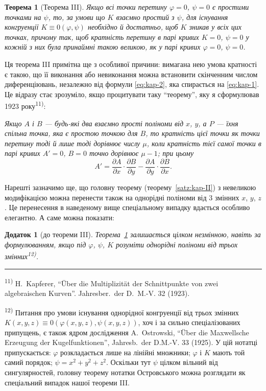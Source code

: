 \documentclass[11pt]{article}
\newcommand{\foreign}[1]{#1}
\theoremstyle{plain}
\newtheorem{satz}{Теорема}
\newtheorem{zusatz}{Додаток}
\begin{document}
\begin{satz}[Теорема III]\label{satz:kap-III}
Якщо всі точки перетину $\varphi = 0$, $\psi = 0$ є простими
точками на $\psi$, то, за умови що $K$ взаємно простий з $\psi$,
для існування конгруенції $K \equiv 0(\varphi, \psi)$ необхідно й
достатньо, щоб $K$ зникав у всіх цих точках, причому так, щоб
кратність перетину в парі кривих $K = 0$, $\psi = 0$ у кожній з них
була принаймні такою великою, як у парі кривих
$\varphi = 0$, $\psi = 0$.
\end{satz}

Ця теорема III примітна ще з особливої причини: вимагана нею умова
кратності є такою, що її виконання або невиконання можна встановити
скінченним числом диференціювань, незалежно від формули
\eqref{eq:kap-2}, яка спирається на \eqref{eq:kap-1}. Це відразу
стає зрозуміло, якщо процитувати таку ``теорему'', яку я сформулював
1923 року\textsuperscript{11)}:

\smallskip
\textit{Якщо $A$ і $B$ --- будь-які два взаємно прості поліноми від
$x$, $y$, а $P$ --- їхня спільна точка, яка є простою точкою для
$B$, то кратність цієї точки як точки перетину тоді й лише тоді
дорівнює числу $\mu$, коли кратність тієї самої точки в парі кривих
$A' = 0$, $B = 0$ точно дорівнює $\mu - 1$; при цьому}
\[
A' = \frac{\partial A}{\partial x} \cdot \frac{\partial B}{\partial y} -
\frac{\partial A}{\partial y} \cdot \frac{\partial B}{\partial x}.
\]

Нарешті зазначимо ще, що головну теорему
(теорему~\ref{satz:kap-II}) з невеликою модифікацією можна перенести
також на однорідні поліноми від 3 змінних $x$, $y$, $z$. Це
перенесення в наведеному вище спеціальному випадку вдається особливо
елегантно. А саме можна показати:

\begin{zusatz}[до теореми III]
Теорема~\ref{satz:kap-III} залишається цілком незмінною, навіть за
формулюванням, якщо під $\varphi$, $\psi$, $K$ розуміти однорідні
поліноми від трьох змінних\textsuperscript{12)}.
\end{zusatz}

\vspace{0.5em}
\noindent\rule{\textwidth}{0.4pt}
\vspace{0.3em}

{\footnotesize
\textsuperscript{11)} H.\ Kapferer, ``Über die Multiplizität der Schnittpunkte von zwei algebraischen
Kurven''. \foreign{Jahresber.\ der D.\ M.-V.} 32 (1923).

\textsuperscript{12)} Питання про умови існування однорідної конгруенції від
трьох змінних $K(x,y,z) \equiv 0(\varphi(x,y,z), \psi(x,y,z))$,
хоч і за сильно спеціалізованих припущень, є також ядром дослідження
A.\ Ostrowski, ``Über die Maxwellsche Erzeugung der Kugelfunktionen'',
\foreign{Jahresb.\ der D.M.-V.} 33 (1925). У цій нотатці припускається:
$\varphi$ розкладається лише на лінійні множники; $\varphi$ і $K$
мають той самий порядок; $\psi = x^{2} + y^{2} + z^{2}$. Оскільки
тут $\psi$ цілком вільний від сингулярностей, головну теорему нотатки
Островського можна розглядати як спеціальний випадок нашої теореми III.
}
\end{document}
